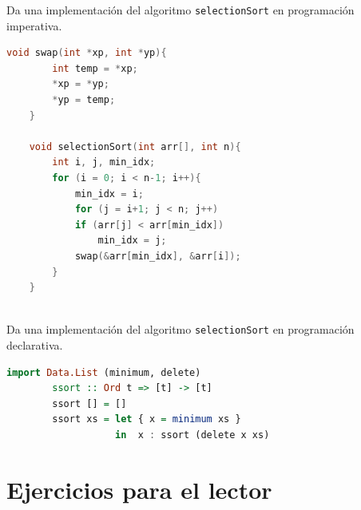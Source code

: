     \bigskip



    \bigskip
    \bigskip

    \begin{exercise}
        Da una implementación del algoritmo \texttt{selectionSort} en programación imperativa.

	\begin{lstlisting}[language=C++]
	void swap(int *xp, int *yp){
	    int temp = *xp;
	    *xp = *yp;
	    *yp = temp;
	}
	 
	void selectionSort(int arr[], int n){
	    int i, j, min_idx;
	    for (i = 0; i < n-1; i++){
	        min_idx = i;
	        for (j = i+1; j < n; j++)
	        if (arr[j] < arr[min_idx])
	            min_idx = j;
	        swap(&arr[min_idx], &arr[i]);
	    }
	}
	 
	\end{lstlisting}
    \end{exercise}

    \begin{exercise}
        Da una implementación del algoritmo \texttt{selectionSort} en programación declarativa.
	\begin{lstlisting}[language=Haskell] import Data.List (minimum, delete)
		ssort :: Ord t => [t] -> [t]
		ssort [] = []
		ssort xs = let { x = minimum xs } 
		           in  x : ssort (delete x xs)
	\end{lstlisting}
    \end{exercise}


\section{Ejercicios para el lector}


